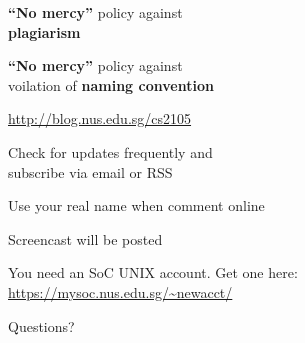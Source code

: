 \begin{frame}
\begin{center}
\large
	\textbf{``No mercy''} policy against\\\textbf{plagiarism}
\end{center}
\end{frame}

\begin{frame}
\begin{center}
\large
	\textbf{``No mercy''} policy against\\voilation of \textbf{naming convention}
\end{center}
\end{frame}

\begin{frame}
\begin{center}
\large
	\url{http://blog.nus.edu.sg/cs2105}
\end{center}
\end{frame}

\begin{frame}
\begin{center}
\large
Check for updates frequently and\\subscribe via email or RSS
\end{center}
\end{frame}

\begin{frame}
\begin{center}
\large Use your real name when comment online
\end{center}
\end{frame}

\begin{frame} \begin{center} \large
Screencast will be posted 
\end{center} \end{frame}

\begin{frame} \begin{center} \large
You need an SoC UNIX account.  Get one here:\\
\url{https://mysoc.nus.edu.sg/~newacct/}
\end{center} \end{frame}

\begin{frame}
\begin{center}
\large
Questions?
\end{center}
\end{frame}

